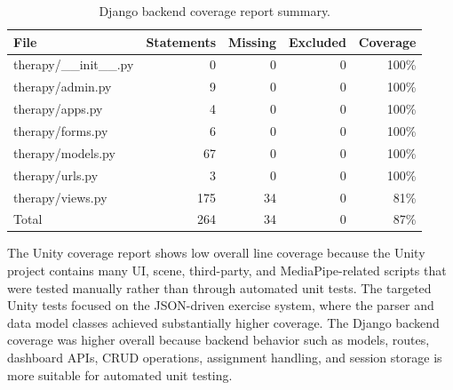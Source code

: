 \begin{table}[H]
    \centering
    \caption{Django backend coverage report summary.}
    \label{tab:django-coverage-summary}
    \begin{tabular}{lrrrr}
        \toprule
        \textbf{File} & \textbf{Statements} & \textbf{Missing} & \textbf{Excluded} & \textbf{Coverage} \\
        \midrule
        therapy/\_\_init\_\_.py & 0 & 0 & 0 & 100\% \\
        therapy/admin.py & 9 & 0 & 0 & 100\% \\
        therapy/apps.py & 4 & 0 & 0 & 100\% \\
        therapy/forms.py & 6 & 0 & 0 & 100\% \\
        therapy/models.py & 67 & 0 & 0 & 100\% \\
        therapy/urls.py & 3 & 0 & 0 & 100\% \\
        therapy/views.py & 175 & 34 & 0 & 81\% \\
        \midrule
        Total & 264 & 34 & 0 & 87\% \\
        \bottomrule
    \end{tabular}
\end{table}

The Unity coverage report shows low overall line coverage because the Unity project contains many UI, scene, third-party, and MediaPipe-related scripts that were tested manually rather than through automated unit tests. The targeted Unity tests focused on the JSON-driven exercise system, where the parser and data model classes achieved substantially higher coverage. The Django backend coverage was higher overall because backend behavior such as models, routes, dashboard APIs, CRUD operations, assignment handling, and session storage is more suitable for automated unit testing.
